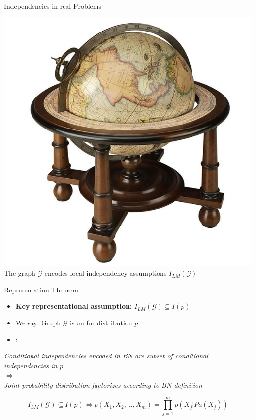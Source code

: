 \begin{frame}{Independencies in real Problems}{}
{\begin{boxBlueNoFill}
\begin{center}
				\includegraphics[scale=0.1]{15_pgm/02_img/globe} \\
				\vspace*{2mm}
				{\footnotesize The graph $\mathcal{G}$ encodes local independency assumptions $I_{LM}(\mathcal{G})$}
			\end{center}
			\vfill
		\end{boxBlueNoFill}
	}
\end{frame}


\begin{frame}{Representation Theorem}{}
	\begin{itemize}
		\item \textbf{Key representational assumption:} $I_{LM}(\mathcal{G}) \subseteq I(p)$
		\item We say: Graph $\mathcal{G}$ is an  for distribution $p$
		\item {}:
	\end{itemize}

	\begin{center}
		\footnotesize
		\textit{Conditional independencies encoded in BN are subset of conditional independencies in $p$ \\
			$\Leftrightarrow$ \\
			Joint probability distribution factorizes according to BN definition}
	\end{center}

	\vspace*{-4mm}
	\begin{equation}
		I_{LM}(\mathcal{G}) \subseteq I(p) \Leftrightarrow p(X_1, X_2, \dots, X_m) = \prod_{j=1}^m p(X_j \vert Pa(X_j))
	\end{equation}
\end{frame}


